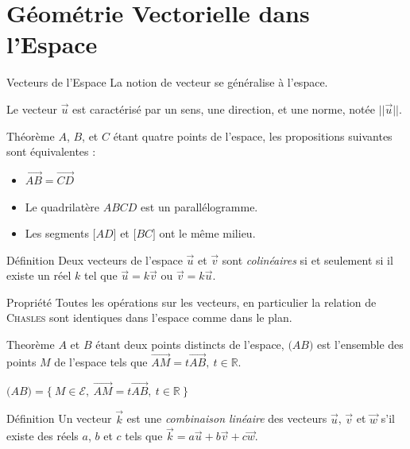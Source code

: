 \documentclass{coursbook}
\begin{document}
    \chapter{Géométrie Vectorielle dans l'Espace}

    \begin{Gpartie}{Vecteurs de l'Espace} 
        La notion de vecteur se généralise à l'espace.

        Le vecteur $\vec{u}$ est caractérisé par un sens, une direction, et une norme, notée $\lvert\lvert{\vec{u}}\rvert\rvert$.
        \begin{Spartie}{Théorème} 
            $A$, $B$, et $C$ étant quatre points de l'espace, les propositions suivantes sont équivalentes :
            \begin{itemize}
                \item $\overrightarrow{AB}=\overrightarrow{CD}$
                \item Le quadrilatère $ABCD$ est un parallélogramme.
                \item Les segments $\big[AD\big]$ et $\big[BC\big]$ ont le même milieu.
            \end{itemize}
        \end{Spartie}
        \begin{Spartie}{Définition} 
            Deux vecteurs de l'espace $\vec{u}$ et $\vec{v}$ sont \emph{colinéaires} si et seulement si il existe un réel $k$ tel que $\vec{u}=k\vec{v}$ ou $\vec{v}=k\vec{u}$.
        \end{Spartie}
        \begin{Spartie}{Propriété} 
            Toutes les opérations sur les vecteurs, en particulier la relation de \textsc{Chasles} sont identiques dans l'espace comme dans le plan.
        \end{Spartie}
        \begin{Spartie}{Theorème} 
            $A$ et $B$ étant deux points distincts de l'espace, $\big(AB\big)$ est l'ensemble des points $M$ de l'espace tels que $\overrightarrow{AM}=t \overrightarrow{AB},\ t\in\mathbb{R}$.

            $\big(AB\big)=\big\{~M\in\mathcal{E},~\overrightarrow{AM}=t\overrightarrow{AB},~t\in\mathbb{R}~\big\}$
        \end{Spartie}
        \begin{Spartie}{Définition} 
            Un vecteur $\vec{k}$ est une \emph{combinaison linéaire} des vecteurs $\vec{u}$, $\vec{v}$ et $\vec{w}$ s'il existe des réels $a$, $b$ et $c$ tels que $\vec{k}=a\vec{u}+b\vec{v}+c\vec{w}$.
        \end{Spartie}
    \end{Gpartie}
\end{document}
